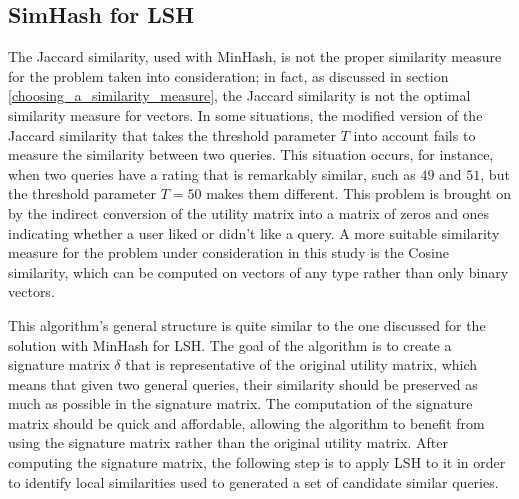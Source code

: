\subsection{SimHash for LSH}
\label{simhash_section}
The Jaccard similarity, used with MinHash, is not the proper similarity measure for the problem taken into consideration; in fact, as discussed in section \ref{choosing_a_similarity_measure}, the Jaccard similarity is not the optimal similarity measure for vectors. In some situations, the modified version of the Jaccard similarity that takes the threshold parameter $T$ into account fails to measure the similarity between two queries. This situation occurs, for instance, when two queries have a rating that is remarkably similar, such as $49$ and $51$, but the threshold parameter $T=50$ makes them different. This problem is brought on by the indirect conversion of the utility matrix into a matrix of zeros and ones indicating whether a user liked or didn't like a query. A more suitable similarity measure for the problem under consideration in this study is the Cosine similarity, which can be computed on vectors of any type rather than only binary vectors.

This algorithm's general structure is quite similar to the one discussed for the solution with MinHash for LSH. The goal of the algorithm is to create a signature matrix $\delta$ that is representative of the original utility matrix, which means that given two general queries, their similarity should be preserved as much as possible in the signature matrix. The computation of the signature matrix should be quick and affordable, allowing the algorithm to benefit from using the signature matrix rather than the original utility matrix. After computing the signature matrix, the following step is to apply LSH to it in order to identify local similarities used to generated a set of candidate similar queries.



